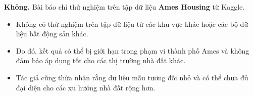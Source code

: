 \textbf{Không.} Bài báo chỉ thử nghiệm trên tập dữ liệu \textbf{Ames Housing} từ Kaggle.

\begin{itemize}
    \item Không có thử nghiệm trên tập dữ liệu từ các khu vực khác hoặc các bộ dữ liệu bất động sản khác.
    \item Do đó, kết quả có thể bị giới hạn trong phạm vi thành phố Ames và không đảm bảo áp dụng tốt cho các thị trường nhà đất khác.
    \item Tác giả cũng thừa nhận rằng dữ liệu mẫu tương đối nhỏ và có thể chưa đủ đại diện cho các xu hướng nhà đất rộng hơn.
\end{itemize}
